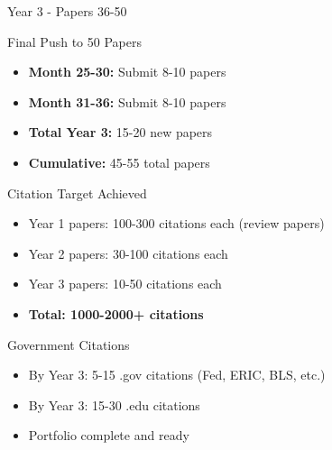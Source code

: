 \documentclass[11pt]{beamer}
\begin{document}
	\begin{frame}{Year 3 - Papers 36-50}
		\scriptsize
		\begin{block}{Final Push to 50 Papers}
			\begin{itemize}
				\item \textbf{Month 25-30:} Submit 8-10 papers
				\item \textbf{Month 31-36:} Submit 8-10 papers
				\item \textbf{Total Year 3:} 15-20 new papers
				\item \textbf{Cumulative:} 45-55 total papers
			\end{itemize}
		\end{block}
		\begin{block}{Citation Target Achieved}
			\begin{itemize}
				\item Year 1 papers: 100-300 citations each (review papers)
				\item Year 2 papers: 30-100 citations each
				\item Year 3 papers: 10-50 citations each
				\item \textbf{Total: 1000-2000+ citations}
			\end{itemize}
		\end{block}
		\begin{block}{Government Citations}
			\begin{itemize}
				\item By Year 3: 5-15 .gov citations (Fed, ERIC, BLS, etc.)
				\item By Year 3: 15-30 .edu citations
				\item Portfolio complete and ready
			\end{itemize}
		\end{block}
	\end{frame}
	
\end{document}
